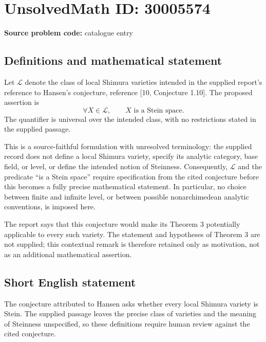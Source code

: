 \documentclass[11pt]{article}
\begin{document}
\section*{UnsolvedMath ID: 30005574}
\textbf{Source problem code:} catalogue entry
\subsection{Definitions and mathematical statement}
Let \(\mathcal L\) denote the class of local Shimura varieties intended in the supplied report's reference to Hansen's conjecture, reference [10, Conjecture 1.10]. The proposed assertion is
\[
\forall X\in\mathcal L,\qquad X\text{ is a Stein space}.
\]
The quantifier is universal over the intended class, with no restrictions stated in the supplied passage.

This is a source-faithful formulation with unresolved terminology: the supplied record does not define a local Shimura variety, specify its analytic category, base field, or level, or define the intended notion of Steinness. Consequently, \(\mathcal L\) and the predicate ``is a Stein space'' require specification from the cited conjecture before this becomes a fully precise mathematical statement. In particular, no choice between finite and infinite level, or between possible nonarchimedean analytic conventions, is imposed here.

The report says that this conjecture would make its Theorem 3 potentially applicable to every such variety. The statement and hypotheses of Theorem 3 are not supplied; this contextual remark is therefore retained only as motivation, not as an additional mathematical assertion.
\subsection{Short English statement}
The conjecture attributed to Hansen asks whether every local Shimura variety is Stein. The supplied passage leaves the precise class of varieties and the meaning of Steinness unspecified, so these definitions require human review against the cited conjecture.
\end{document}
